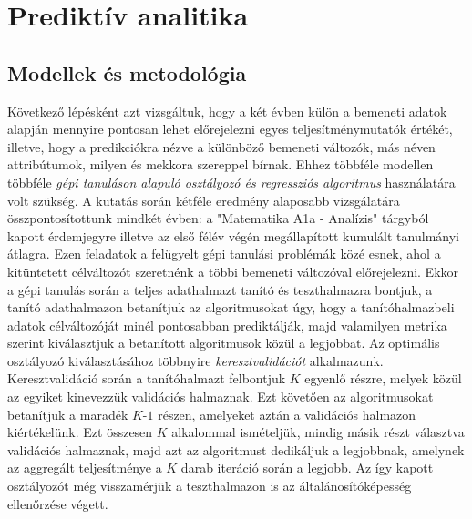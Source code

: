 \documentclass[12pt]{article}
\begin{document}
\newpage
\section{Prediktív analitika}

\subsection{Modellek és metodológia}

Következő lépésként azt vizsgáltuk, hogy a két évben külön a bemeneti adatok alapján mennyire pontosan lehet előrejelezni egyes teljesítménymutatók értékét, illetve, hogy a predikciókra nézve a különböző bemeneti változók, más néven attribútumok, milyen és mekkora szereppel bírnak. Ehhez többféle modellen többféle \textit{gépi tanuláson alapuló osztályozó és regressziós algoritmus} használatára volt szükség. A kutatás során kétféle eredmény alaposabb vizsgálatára összpontosítottunk mindkét évben: a "Matematika A1a - Analízis" tárgyból kapott érdemjegyre illetve az első félév végén megállapított kumulált tanulmányi átlagra. Ezen feladatok a felügyelt gépi tanulási problémák közé esnek, ahol a kitüntetett célváltozót szeretnénk a többi bemeneti változóval előrejelezni\cite{bevadat}. Ekkor a gépi tanulás során a teljes adathalmazt tanító és teszthalmazra bontjuk, a tanító adathalmazon betanítjuk az algoritmusokat úgy, hogy a tanítóhalmazbeli adatok célváltozóját minél pontosabban prediktálják, majd valamilyen metrika szerint kiválasztjuk a betanított algoritmusok közül a legjobbat. Az optimális osztályozó kiválasztásához többnyire \textit{keresztvalidációt} alkalmazunk. Keresztvalidáció során a tanítóhalmazt felbontjuk $K$ egyenlő részre, melyek közül az egyiket kinevezzük validációs halmaznak. Ezt követően az algoritmusokat betanítjuk a maradék $K$-$1$ részen, amelyeket aztán a validációs halmazon kiértékelünk. Ezt összesen $K$ alkalommal ismételjük, mindig másik részt választva validációs halmaznak, majd azt az algoritmust dedikáljuk a legjobbnak, amelynek az aggregált teljesítménye a $K$ darab iteráció során a legjobb. Az így kapott osztályozót még visszamérjük a teszthalmazon is az általánosítóképesség ellenőrzése végett. %
\end{document}
